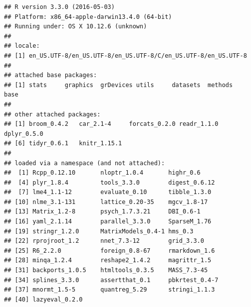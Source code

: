 \documentclass[]{article}
\begin{document}
\begin{verbatim}
## R version 3.3.0 (2016-05-03)
## Platform: x86_64-apple-darwin13.4.0 (64-bit)
## Running under: OS X 10.12.6 (unknown)
## 
## locale:
## [1] en_US.UTF-8/en_US.UTF-8/en_US.UTF-8/C/en_US.UTF-8/en_US.UTF-8
## 
## attached base packages:
## [1] stats     graphics  grDevices utils     datasets  methods   base     
## 
## other attached packages:
## [1] broom_0.4.2   car_2.1-4     forcats_0.2.0 readr_1.1.0   dplyr_0.5.0  
## [6] tidyr_0.6.1   knitr_1.15.1 
## 
## loaded via a namespace (and not attached):
##  [1] Rcpp_0.12.10       nloptr_1.0.4       highr_0.6         
##  [4] plyr_1.8.4         tools_3.3.0        digest_0.6.12     
##  [7] lme4_1.1-12        evaluate_0.10      tibble_1.3.0      
## [10] nlme_3.1-131       lattice_0.20-35    mgcv_1.8-17       
## [13] Matrix_1.2-8       psych_1.7.3.21     DBI_0.6-1         
## [16] yaml_2.1.14        parallel_3.3.0     SparseM_1.76      
## [19] stringr_1.2.0      MatrixModels_0.4-1 hms_0.3           
## [22] rprojroot_1.2      nnet_7.3-12        grid_3.3.0        
## [25] R6_2.2.0           foreign_0.8-67     rmarkdown_1.6     
## [28] minqa_1.2.4        reshape2_1.4.2     magrittr_1.5      
## [31] backports_1.0.5    htmltools_0.3.5    MASS_7.3-45       
## [34] splines_3.3.0      assertthat_0.1     pbkrtest_0.4-7    
## [37] mnormt_1.5-5       quantreg_5.29      stringi_1.1.3     
## [40] lazyeval_0.2.0
\end{verbatim}
\end{document}
